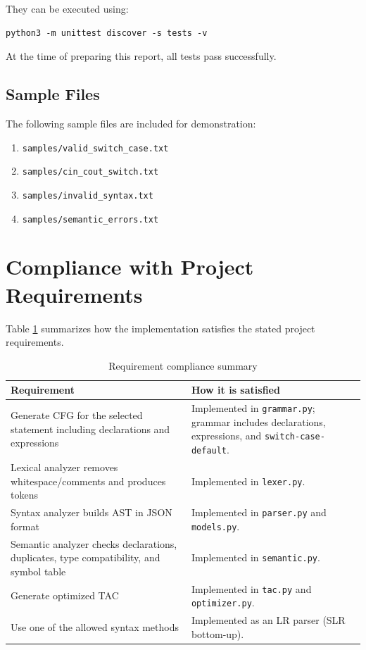 \documentclass[12pt,a4paper]{article}
\begin{document}
They can be executed using:

\begin{lstlisting}
python3 -m unittest discover -s tests -v
\end{lstlisting}

At the time of preparing this report, all tests pass successfully.

\subsection{Sample Files}
The following sample files are included for demonstration:

\begin{enumerate}
    \item \texttt{samples/valid\_switch\_case.txt}
    \item \texttt{samples/cin\_cout\_switch.txt}
    \item \texttt{samples/invalid\_syntax.txt}
    \item \texttt{samples/semantic\_errors.txt}
\end{enumerate}

\section{Compliance with Project Requirements}
Table \ref{tab:compliance} summarizes how the implementation satisfies the stated project requirements.

\begin{table}[h!]
\centering
\begin{tabular}{|p{}|p{}|}
\hline
\textbf{Requirement} & \textbf{How it is satisfied} \\
\hline
Generate CFG for the selected statement including declarations and expressions & Implemented in \texttt{grammar.py}; grammar includes declarations, expressions, and \texttt{switch-case-default}. \\
\hline
Lexical analyzer removes whitespace/comments and produces tokens & Implemented in \texttt{lexer.py}. \\
\hline
Syntax analyzer builds AST in JSON format & Implemented in \texttt{parser.py} and \texttt{models.py}. \\
\hline
Semantic analyzer checks declarations, duplicates, type compatibility, and symbol table & Implemented in \texttt{semantic.py}. \\
\hline
Generate optimized TAC & Implemented in \texttt{tac.py} and \texttt{optimizer.py}. \\
\hline
Use one of the allowed syntax methods & Implemented as an LR parser (SLR bottom-up). \\
\hline
\end{tabular}
\caption{Requirement compliance summary}
\label{tab:compliance}
\end{table}
\end{document}
